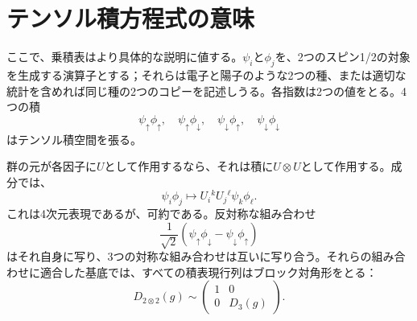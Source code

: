 \section{テンソル積方程式の意味}

ここで、乗積表はより具体的な説明に値する。\(\psi_i\)と\(\phi_j\)を、2つのスピン1/2の対象を生成する演算子とする；それらは電子と陽子のような2つの種、または適切な統計を含めれば同じ種の2つのコピーを記述しうる。各指数は2つの値をとる。4つの積
\begin{equation}
\psi_\uparrow\phi_\uparrow,
\quad
\psi_\uparrow\phi_\downarrow,
\quad
\psi_\downarrow\phi_\uparrow,
\quad
\psi_\downarrow\phi_\downarrow
\end{equation}
はテンソル積空間を張る。

群の元が各因子に\(U\)として作用するなら、それは積に\(U\otimes U\)として作用する。成分では、
\begin{equation}
\psi_i\phi_j
\longmapsto
U_i{}^kU_j{}^\ell\psi_k\phi_\ell.
\label{eq:l4-product-action}
\end{equation}
これは4次元表現であるが、可約である。反対称な組み合わせ
\begin{equation}
\frac{1}{\sqrt2}
(\psi_\uparrow\phi_\downarrow
-\psi_\downarrow\phi_\uparrow)
\end{equation}
はそれ自身に写り、3つの対称な組み合わせは互いに写り合う。それらの組み合わせに適合した基底では、すべての積表現行列はブロック対角形をとる：
\begin{equation}
D_{2\otimes2}(g)
\sim
\begin{pmatrix}
1&0\\
0&D_3(g)
\end{pmatrix}.
\label{eq:l4-spin-block-diagonal}
\end{equation}

\begin{classroomqa}
\end{classroomqa}

\begin{classroomqa}
\end{classroomqa}

